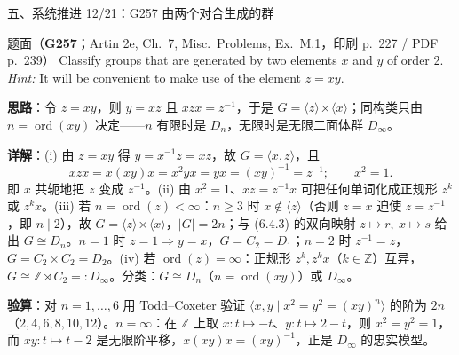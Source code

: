 \documentclass[aspectratio=169,10pt,fontset=none]{ctexbeamer}
\newcommand{\ex}[1]{\textcolor{accent}{\footnotesize\bfseries #1}}
\newcommand{\key}[1]{\textcolor{ink}{\bfseries #1}}
\begin{document}
\begin{frame}[t]{五、系统推进 12/21：G257 由两个对合生成的群}
\label{ex:G257}
\scriptsize
\begin{block}{\footnotesize 题面（\ex{G257}；Artin 2e, Ch.~7, Misc.\ Problems, Ex.~M.1，印刷 p.~227 / PDF p.~239）}
Classify groups that are generated by two elements $x$ and $y$ of order 2. \emph{Hint:} It will be convenient to make use of the element $z=xy$.
\end{block}
\key{思路}：令 $z=xy$，则 $y=xz$ 且 $xzx=z^{-1}$，于是 $G=\langle z\rangle\rtimes\langle x\rangle$；同构类只由 $n=\operatorname{ord}(xy)$ 决定——$n$ 有限时是 $D_n$，无限时是无限二面体群 $D_\infty$。

\key{详解}：(i) 由 $z=xy$ 得 $y=x^{-1}z=xz$，故 $G=\langle x,z\rangle$，且
\[
xzx=x(xy)x=x^2yx=yx=(xy)^{-1}=z^{-1};\qquad x^2=1 .
\]
即 $x$ 共轭地把 $z$ 变成 $z^{-1}$。(ii) 由 $x^2=1$、$xz=z^{-1}x$ 可把任何单词化成正规形 $z^k$ 或 $z^k x$。(iii) 若 $n=\operatorname{ord}(z)<\infty$：$n\ge3$ 时 $x\notin\langle z\rangle$（否则 $z=x$ 迫使 $z=z^{-1}$，即 $n\mid2$），故 $G=\langle z\rangle\rtimes\langle x\rangle$，$|G|=2n$；与 (6.4.3) 的双向映射 $z\mapsto r,\ x\mapsto s$ 给出 $G\cong D_n$。$n=1$ 时 $z=1\Rightarrow y=x$，$G=C_2=D_1$；$n=2$ 时 $z^{-1}=z$，$G=C_2\times C_2=D_2$。(iv) 若 $\operatorname{ord}(z)=\infty$：正规形 $z^k,z^kx$（$k\in\mathbb Z$）互异，$G\cong\mathbb Z\rtimes C_2=:D_\infty$。分类：$G\cong D_n$（$n=\operatorname{ord}(xy)$）或 $D_\infty$。

\key{验算}：对 $n=1,\dots,6$ 用 Todd--Coxeter 验证 $\langle x,y\mid x^2=y^2=(xy)^n\rangle$ 的阶为 $2n$（$2,4,6,8,10,12$）。$n=\infty$：在 $\mathbb Z$ 上取 $x:t\mapsto -t$、$y:t\mapsto2-t$，则 $x^2=y^2=1$，而 $xy:t\mapsto t-2$ 是无限阶平移，$x(xy)x=(xy)^{-1}$，正是 $D_\infty$ 的忠实模型。
\end{frame}
\end{document}
